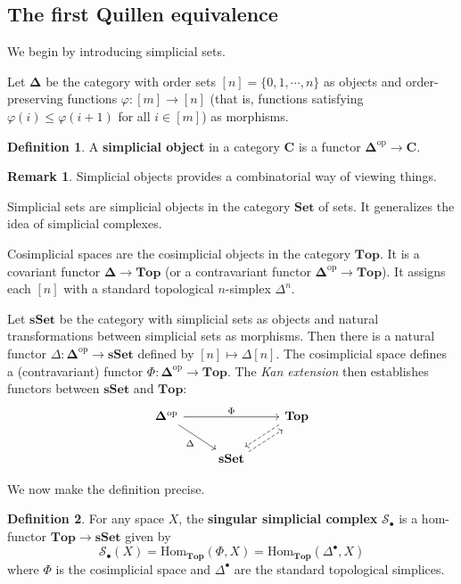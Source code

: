 \documentclass[psamsfonts]{amsart}
\theoremstyle{definition}
\newtheorem{defn}{Definition}[section]
\newtheorem{rem}{Remark}[section]
\newcommand{\Top}{\mathbf{Top}}
\newcommand{\sSet}{\mathbf{sSet}}
\newcommand{\Hom}{\mathrm{Hom}}
\numberwithin{equation}{section}
\begin{document}
\subsection{The first Quillen equivalence}

We begin by introducing simplicial sets.\medbreak

Let $\mathbf{\Delta}$ be the category with order sets $[n]=\{0,1,\cdots,n\}$ as objects and order-preserving functions $\varphi:[m]\to[n]$ (that is, functions satisfying $\varphi(i)\leq\varphi(i+1)$ for all $i\in[m]$)
as morphisms.

\begin{defn}
A \textbf{simplicial object} in a category $\mathbf{C}$ is a functor $\mathbf{\Delta}^\textrm{op}\to\mathbf{C}$.
\end{defn}

\begin{rem}
Simplicial objects provides a combinatorial way of viewing things.

Simplicial sets are simplicial objects in the category $\mathbf{Set}$ of sets. It generalizes the idea of simplicial complexes.

Cosimplicial spaces are the cosimplicial objects in the category $\Top$. It is a covariant functor $\mathbf{\Delta}\to\Top$ (or a contravariant functor $\mathbf{\Delta}^\textrm{op}\to\Top$). It assigns each $[n]$ with a standard topological $n$-simplex $\Delta^n$.
\end{rem}

Let $\sSet$ be the category with simplicial sets as objects and natural transformations between simplicial sets as morphisms. Then there is a natural functor $\Delta:\mathbf{\Delta}^\textrm{op}\to\sSet$ defined by $[n]\mapsto\Delta[n]$. The cosimplicial space defines a (contravariant) functor $\Phi:\mathbf{\Delta}^\textrm{op}\to\Top$. The \textit{Kan extension} then establishes functors between $\sSet$ and $\Top$:
\[\begin{tikzcd}
\mathbf{\Delta}^\textrm{op}\arrow[dr,"\Delta"']\arrow[rr,"\Phi"]&&\Top\arrow[dl,shift right,dashed]\\
&\sSet\arrow[ur,shift right,dashed]
\end{tikzcd}\]

We now make the definition precise.

\begin{defn}
For any space $X$, the \textbf{singular simplicial complex} $\mathcal{S}_\bullet$ is a hom-functor $\Top\to\sSet$ given by
\[\mathcal{S}_\bullet(X)=\Hom_\Top(\Phi,X)=\Hom_\Top(\Delta^\bullet,X)\]
where $\Phi$ is the cosimplicial space and $\Delta^\bullet$ are the standard topological simplices.
\end{defn}
\end{document}
